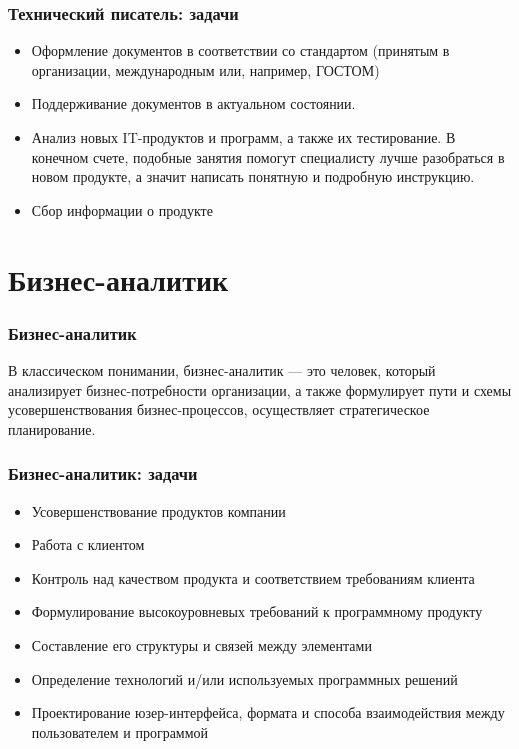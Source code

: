 \documentclass{../industrial-development}
\begin{document}
	\begin{frame} \frametitle{Технический писатель: задачи}
			\begin{itemize}
				\item Оформление документов в соответствии со стандартом (принятым в организации, международным или, например, ГОСТОМ)
				\item Поддерживание документов в актуальном состоянии.
				\item Анализ новых IT-продуктов и программ, а также их тестирование. В конечном счете, подобные занятия помогут специалисту лучше разобраться в новом продукте, а значит написать понятную и подробную инструкцию.
				\item  Сбор информации о продукте
			\end{itemize}
	\end{frame}
	
	\section{Бизнес-аналитик}
	
	\begin{frame} \frametitle{Бизнес-аналитик}
		\begin{block}{}
			\alert {}В классическом понимании, {бизнес-аналитик} — это человек, который анализирует бизнес-потребности организации, а также формулирует пути и схемы усовершенствования бизнес-процессов, осуществляет стратегическое планирование. 
		\end{block}
		
	\end{frame}
	
	\begin{frame} \frametitle{Бизнес-аналитик: задачи}
		\begin{itemize}
			\item Усовершенствование продуктов компании
			\item Работа с клиентом
			\item Контроль над качеством продукта и соответствием требованиям клиента
			\item Формулирование высокоуровневых требований к программному продукту
			\item Составление его структуры и связей между элементами
			\item Определение технологий и/или используемых программных решений
			\item Проектирование юзер-интерфейса, формата и способа взаимодействия между пользователем и программой
		\end{itemize}
	\end{frame}
	
\end{document}
